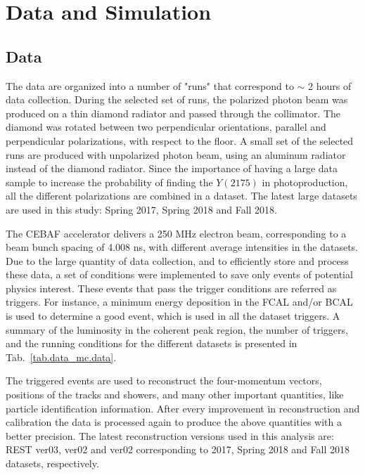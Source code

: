 \section{Data and Simulation}
\label{sec.data_mc}

\subsection{Data}
\label{sec.data_mc.data}

The data are organized into a number of "runs" that correspond to $\sim$ 2 hours of data collection. During the selected set of runs, the polarized photon beam was produced on a thin diamond radiator and passed through the collimator. The diamond was rotated between two perpendicular orientations, parallel and perpendicular polarizations, with respect to the floor. A small set of the selected runs are produced with unpolarized photon beam, using an aluminum radiator instead of the diamond radiator. Since the importance of having a large data sample to increase the probability of finding the $Y(2175)$ in photoproduction, all the different polarizations are combined in a dataset. The latest large datasets are used in this study: Spring 2017, Spring 2018 and Fall 2018.
~\par The CEBAF accelerator delivers a 250 MHz electron beam, corresponding to a beam bunch spacing of 4.008 ns, with different average intensities in the datasets. Due to the large quantity of data collection, and to efficiently store and process these data, a set of conditions were implemented to save only events of potential physics interest. These events that pass the trigger conditions are referred as triggers. For instance, a minimum energy deposition in the FCAL and/or BCAL is used to determine a good event, which is used in all the dataset triggers. A summary of the luminosity in the coherent peak region, the number of triggers, and the running conditions for the different datasets is presented in Tab.~\ref{tab.data_mc.data}.
~\par The triggered events are used to reconstruct the four-momentum vectors, positions of the tracks and showers, and many other important quantities, like particle identification information. After every improvement in reconstruction and calibration the data is processed again to produce the above quantities with a better precision. The latest reconstruction versions used in this analysis are: REST ver03, ver02 and ver02 corresponding to 2017, Spring 2018 and Fall 2018 datasets, respectively.

